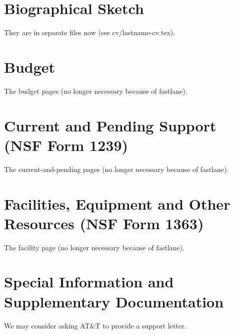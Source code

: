 \documentclass[11pt]{article}
\begin{document}
\section{Biographical Sketch}
%

They are in separate files now (see cv/lastname-cv.tex).

\section{Budget}

The budget pages (no longer necessary because of fastlane). 

\section{Current and Pending Support (NSF Form 1239)}

The current-and-pending pages (no longer necessary because of fastlane). 

\section{Facilities, Equipment and Other Resources (NSF Form 1363)}

The facility page (no longer necessary because of fastlane).

\section{Special Information and Supplementary Documentation}

We may consider asking AT\&{}T to provide a support letter.
\end{document}
